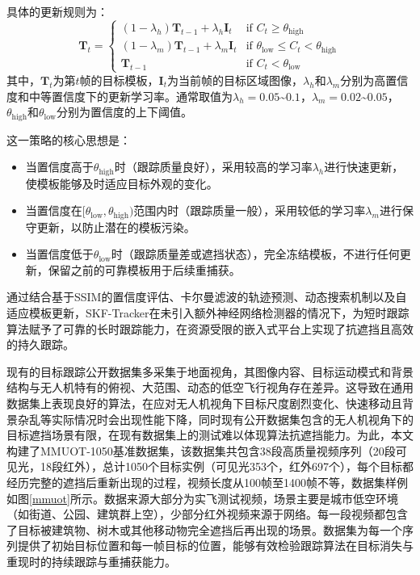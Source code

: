 具体的更新规则为：
\begin{equation}
\mathbf{T}_{t} = \begin{cases}
(1-\lambda_h) \mathbf{T}_{t-1} + \lambda_h \mathbf{I}_t & \text{if } C_t \geq \theta_{\text{high}} \\
(1-\lambda_m) \mathbf{T}_{t-1} + \lambda_m \mathbf{I}_t & \text{if } \theta_{\text{low}} \leq C_t < \theta_{\text{high}} \\
\mathbf{T}_{t-1} & \text{if } C_t < \theta_{\text{low}}
\end{cases}
\end{equation}
其中，$\mathbf{T}_t$为第$t$帧的目标模板，$\mathbf{I}_t$为当前帧的目标区域图像，$\lambda_h$和$\lambda_m$分别为高置信度和中等置信度下的更新学习率。通常取值为$\lambda_h = 0.05$\textasciitilde $0.1$，$\lambda_m = 0.02$\textasciitilde $0.05$，$\theta_{\text{high}}$和$\theta_{\text{low}}$分别为置信度的上下阈值。

这一策略的核心思想是：
\begin{itemize}
    \item 当置信度高于$\theta_{\text{high}}$时（跟踪质量良好），采用较高的学习率$\lambda_h$进行快速更新，使模板能够及时适应目标外观的变化。
    \item 当置信度在$[\theta_{\text{low}}, \theta_{\text{high}})$范围内时（跟踪质量一般），采用较低的学习率$\lambda_m$进行保守更新，以防止潜在的模板污染。
    \item 当置信度低于$\theta_{\text{low}}$时（跟踪质量差或遮挡状态），完全冻结模板，不进行任何更新，保留之前的可靠模板用于后续重捕获。
\end{itemize}

通过结合基于SSIM的置信度评估、卡尔曼滤波的轨迹预测、动态搜索机制以及自适应模板更新，SKF-Tracker在未引入额外神经网络检测器的情况下，为短时跟踪算法赋予了可靠的长时跟踪能力，在资源受限的嵌入式平台上实现了抗遮挡且高效的持久跟踪。

现有的目标跟踪公开数据集多采集于地面视角，其图像内容、目标运动模式和背景结构与无人机特有的俯视、大范围、动态的低空飞行视角存在差异。这导致在通用数据集上表现良好的算法，在应对无人机视角下目标尺度剧烈变化、快速移动且背景杂乱等实际情况时会出现性能下降，同时现有公开数据集包含的无人机视角下的目标遮挡场景有限，在现有数据集上的测试难以体现算法抗遮挡能力。为此，本文构建了MMUOT-1050基准数据集，该数据集共包含38段高质量视频序列（20段可见光，18段红外），总计1050个目标实例（可见光353个，红外697个），每个目标都经历完整的遮挡后重新出现的过程，视频长度从100帧至1400帧不等，数据集样例如图\ref{mmuot}所示。数据来源大部分为实飞测试视频，场景主要是城市低空环境（如街道、公园、建筑群上空），少部分红外视频来源于网络。每一段视频都包含了目标被建筑物、树木或其他移动物完全遮挡后再出现的场景。数据集为每一个序列提供了初始目标位置和每一帧目标的位置，能够有效检验跟踪算法在目标消失与重现时的持续跟踪与重捕获能力。

